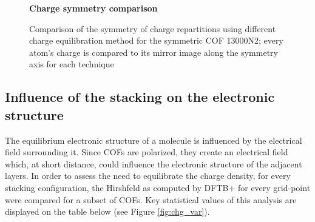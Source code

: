 %
\begin{figure}[H]
\begin{centering}
\textbf{Charge symmetry comparison}\par\medskip
{}
\caption{Comparison of the symmetry of charge repartitions using different charge equilibration method for the symmetric COF 13000N2; every atom's charge is compared to its mirror image along the symmetry axis for each technique}
\label{fig:symetry}
\end{centering}
\end{figure}

\subsection{Influence of the stacking on the electronic structure}

The equilibrium electronic structure of a molecule is influenced by the electrical field surrounding it. Since COFs are polarized, they create an electrical field which, at short distance, could influence the electronic structure of the adjacent layers. In order to assess the need to equilibrate the charge density, for every stacking configuration, the Hirshfeld as computed by DFTB+ for every grid-point were compared for a subset of COFs. Key statistical values of this analysis are displayed on the table below (see Figure \ref{fig:chg_var}).

